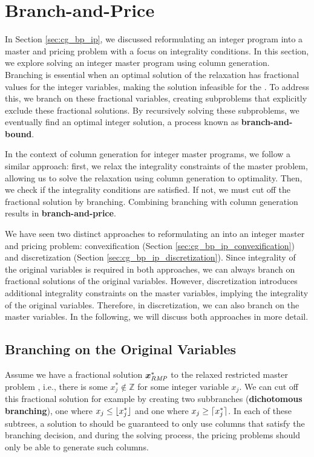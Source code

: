 \section{Branch-and-Price}\label{sec:cg_bp_bp}
In Section \ref{sec:cg_bp_ip}, we discussed reformulating an integer program into a master and pricing problem with a focus on integrality conditions. In this section, we explore solving an integer master program using column generation. Branching is essential when an optimal solution of the \LP{} relaxation has fractional values for the integer variables, making the solution infeasible for the \IP{}. To address this, we branch on these fractional variables, creating subproblems that explicitly exclude these fractional solutions. By recursively solving these subproblems, we eventually find an optimal integer solution, a process known as \textbf{branch-and-bound}.

In the context of column generation for integer master programs, we follow a similar approach: first, we relax the integrality constraints of the master problem, allowing us to solve the relaxation using column generation to optimality. Then, we check if the integrality conditions are satisfied. If not, we must cut off the fractional solution by branching. Combining branching with column generation results in \textbf{branch-and-price}.

We have seen two distinct approaches to reformulating an \IP{} into an integer master and pricing problem: convexification (Section \ref{sec:cg_bp_ip_convexification}) and discretization (Section \ref{sec:cg_bp_ip_discretization}). Since integrality of the original variables is required in both approaches, we can always branch on fractional solutions of the original variables. However, discretization introduces additional integrality constraints on the master variables, implying the integrality of the original variables. Therefore, in discretization, we can also branch on the master variables. In the following, we will discuss both approaches in more detail.

\subsection{Branching on the Original Variables}\label{sec:cg_bp_bp_branching_original}
Assume we have a fractional solution ${\bm{x}}^*_{\textit{RMP}}{}$ to the relaxed restricted master problem \RMP{}, i.e., there is some $x_j^* \not\in \mathbb{Z}$ for some integer variable $x_j$. We can cut off this fractional solution for example by creating two subbranches (\textbf{dichotomous branching}), one where $x_j \leq \lfloor x_j^*\rfloor$ and one where $x_j \geq \lceil x_j^*\rceil$. In each of these subtrees, a solution to \RMP{} should be guaranteed to only use columns that satisfy the branching decision, and during the solving process, the pricing problems should only be able to generate such columns.

